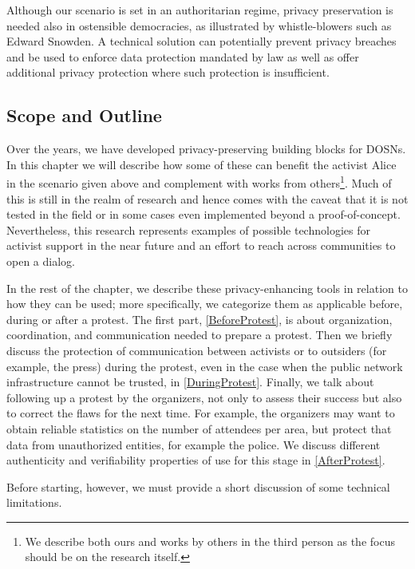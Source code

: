 Although our scenario is set in an authoritarian regime, privacy
preservation is needed also in ostensible democracies, as illustrated
by whistle-blowers such as Edward Snowden. 
A technical solution can potentially prevent privacy breaches and be
used to enforce data protection mandated by law as well as offer
additional privacy protection where such protection is insufficient.



\subsection{Scope and Outline}
\label{Outline}

Over the years, we have developed privacy-preserving building blocks
for \acp{DOSN}.  In this chapter we will describe how some of these
can benefit the activist Alice in the scenario given above and
complement with works from others\footnote{We describe both ours and
  works by others in the third person as the focus should be on the
  research itself.}. Much of this is still in the realm of research
and hence comes with the caveat that it is not tested in the field or
in some cases even implemented beyond a
proof-of-concept. Nevertheless, this research represents examples of
possible technologies for activist support in the near
future and an effort to reach across communities to open a dialog.

In the rest of the chapter, we describe these privacy-enhancing tools
in relation to how they can be used; more specifically, we categorize
them as applicable before, during or after a protest. The first part,
\cref{BeforeProtest}, is about organization, coordination, and
communication needed to prepare a protest.  Then we briefly discuss
the protection of communication between activists or to outsiders (for example, the
press) during the protest, even in the case when the public network
infrastructure cannot be trusted, in \cref{DuringProtest}.
    Finally, we talk about following up a protest by the organizers, not only to assess their success 
    but also to correct the flaws for the next time.  For example, the 
    organizers may want to obtain reliable statistics on the number of 
    attendees per area, but protect that data from unauthorized
    entities, for example the police.
    We discuss different authenticity and verifiability properties of use for 
    this stage in \cref{AfterProtest}.


Before starting, however, we must provide a short discussion of some technical 
limitations.

